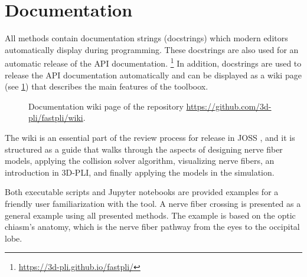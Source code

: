 \section{Documentation}
%
All methods contain documentation strings (docstrings)
which modern editors automatically display during programming.
These docstrings are also used for an automatic release of the \ac{API} documentation.
\footnote{\url{https://3d-pli.github.io/fastpli/}}
In addition,  docstrings are used to release the \ac{API} documentation automatically and can be displayed as a wiki page (see \cref{fig:fastpli_wiki}) that describes the main features of the toolboox. 
% 
\begin{figure}[!t]
   \centering
  \caption{Documentation wiki page of the  repository \url{https://github.com/3d-pli/fastpli/wiki}.}
  \label{fig:fastpli_wiki}
\end{figure}
% 
The wiki is an essential part of the review process for release in \ac{JOSS} \cite{Matuschke2021}, and it is structured as a guide that walks through the aspects of designing nerve fiber models, applying the collision solver algorithm, visualizing nerve fibers, an introduction in \ac{3D-PLI}, and finally applying the models in the simulation.
\par
% 
Both executable \python{} scripts and Jupyter notebooks are provided examples for a friendly user familiarization with the tool. A nerve fiber crossing is presented as a general example using all presented methods. The example is based on the optic chiasm's anatomy, which is the nerve fiber pathway from the eyes to the occipital lobe.